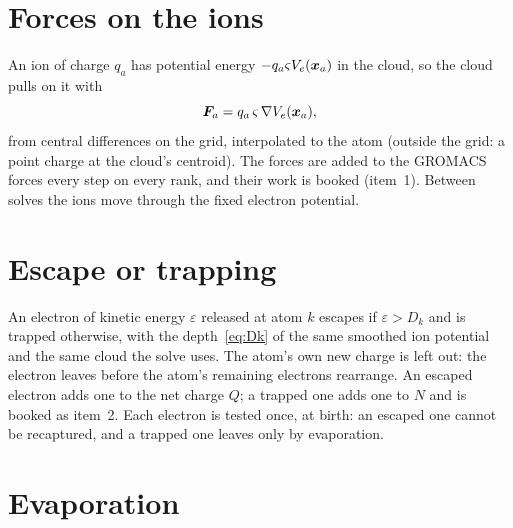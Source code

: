 \section{Forces on the ions}

An ion of charge $q_a$ has potential energy $-q_a\varsigma V_e(\bm{x}_a)$ in the cloud, so the cloud pulls on it with
\begin{equation}
  \bm{F}_a = q_a\,\varsigma\,\nabla V_e(\bm{x}_a),
\end{equation}
from central differences on the grid, interpolated to the atom (outside the grid: a point charge at the cloud's
centroid).
The forces are added to the GROMACS forces every step on every rank, and their work is booked (item~1).
Between solves the ions move through the fixed electron potential.

\section{Escape or trapping}
\label{sec:escape}

An electron of kinetic energy $\varepsilon$ released at atom $k$ escapes if $\varepsilon > D_k$ and is trapped
otherwise, with the depth~\eqref{eq:Dk} of the same smoothed ion potential and the same cloud the solve uses.
The atom's own new charge is left out: the electron leaves before the atom's remaining electrons rearrange.
An escaped electron adds one to the net charge $Q$; a trapped one adds one to $N$ and is booked as item~2.
Each electron is tested once, at birth: an escaped one cannot be recaptured, and a trapped one leaves only by
evaporation.

\section{Evaporation}
\label{sec:evaporation}


